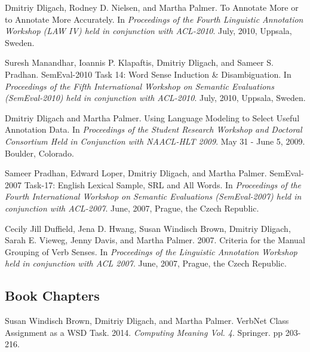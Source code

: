 \documentclass[letterpaper]{article}
\renewenvironment{itemize}{
  \begin{list}{}{
    \setlength{\leftmargin}{1.5em}
  }
}{
  \end{list}
}
\begin{document}
\begin{itemize}
\item Dmitriy Dligach, Rodney D. Nielsen, and Martha Palmer. To Annotate More or to Annotate More Accurately. In \emph{Proceedings of the Fourth Linguistic Annotation Workshop (LAW IV) held in conjunction with ACL-2010}. July, 2010, Uppsala, Sweden.
\item Suresh Manandhar, Ioannis P. Klapaftis, Dmitriy Dligach, and Sameer S. Pradhan. SemEval-2010 Task 14: Word Sense Induction \& Disambiguation. In \emph{Proceedings of the Fifth International Workshop on Semantic Evaluations (SemEval-2010) held in conjunction with ACL-2010}. July, 2010, Uppsala, Sweden.
\item Dmitriy Dligach and Martha Palmer. Using Language Modeling to Select Useful Annotation Data. In \emph {Proceedings of the Student Research Workshop and Doctoral Consortium Held in Conjunction with NAACL-HLT 2009}. May 31 - June 5, 2009. Boulder, Colorado.
\item Sameer Pradhan, Edward Loper, Dmitriy Dligach, and Martha Palmer. SemEval-2007 Task-17: English Lexical Sample, SRL and All Words. In \emph {Proceedings of the Fourth International Workshop on Semantic Evaluations (SemEval-2007) held in conjunction with ACL-2007}. June, 2007, Prague, the Czech Republic.
\item Cecily Jill Duffield, Jena D. Hwang, Susan Windisch Brown, Dmitriy Dligach, Sarah E. Vieweg, Jenny Davis, and Martha Palmer. 2007. Criteria for the Manual Grouping of Verb Senses. In \emph {Proceedings of the Linguistic Annotation Workshop held in conjunction with ACL 2007}. June, 2007, Prague, the Czech Republic.
\end{itemize}

\subsection*{Book Chapters}
\begin{itemize}
\item Susan Windisch Brown, Dmitriy Dligach, and Martha Palmer. VerbNet Class Assignment as a WSD Task. 2014. \emph{Computing Meaning Vol. 4}. Springer. pp 203-216.
\end{itemize}
\end{document}
